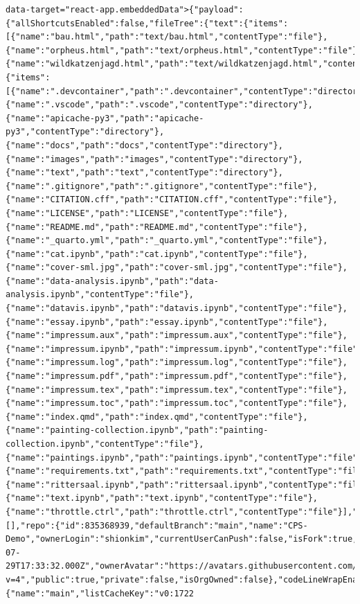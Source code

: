 \documentclass[
  letterpaper,
]{book}
\begin{document}
\begin{verbatim}
data-target="react-app.embeddedData">{"payload":{"allShortcutsEnabled":false,"fileTree":{"text":{"items":[{"name":"bau.html","path":"text/bau.html","contentType":"file"},{"name":"orpheus.html","path":"text/orpheus.html","contentType":"file"},{"name":"wildkatzenjagd.html","path":"text/wildkatzenjagd.html","contentType":"file"}],"totalCount":3},"":{"items":[{"name":".devcontainer","path":".devcontainer","contentType":"directory"},{"name":".vscode","path":".vscode","contentType":"directory"},{"name":"apicache-py3","path":"apicache-py3","contentType":"directory"},{"name":"docs","path":"docs","contentType":"directory"},{"name":"images","path":"images","contentType":"directory"},{"name":"text","path":"text","contentType":"directory"},{"name":".gitignore","path":".gitignore","contentType":"file"},{"name":"CITATION.cff","path":"CITATION.cff","contentType":"file"},{"name":"LICENSE","path":"LICENSE","contentType":"file"},{"name":"README.md","path":"README.md","contentType":"file"},{"name":"_quarto.yml","path":"_quarto.yml","contentType":"file"},{"name":"cat.ipynb","path":"cat.ipynb","contentType":"file"},{"name":"cover-sml.jpg","path":"cover-sml.jpg","contentType":"file"},{"name":"data-analysis.ipynb","path":"data-analysis.ipynb","contentType":"file"},{"name":"datavis.ipynb","path":"datavis.ipynb","contentType":"file"},{"name":"essay.ipynb","path":"essay.ipynb","contentType":"file"},{"name":"impressum.aux","path":"impressum.aux","contentType":"file"},{"name":"impressum.ipynb","path":"impressum.ipynb","contentType":"file"},{"name":"impressum.log","path":"impressum.log","contentType":"file"},{"name":"impressum.pdf","path":"impressum.pdf","contentType":"file"},{"name":"impressum.tex","path":"impressum.tex","contentType":"file"},{"name":"impressum.toc","path":"impressum.toc","contentType":"file"},{"name":"index.qmd","path":"index.qmd","contentType":"file"},{"name":"painting-collection.ipynb","path":"painting-collection.ipynb","contentType":"file"},{"name":"paintings.ipynb","path":"paintings.ipynb","contentType":"file"},{"name":"requirements.txt","path":"requirements.txt","contentType":"file"},{"name":"rittersaal.ipynb","path":"rittersaal.ipynb","contentType":"file"},{"name":"text.ipynb","path":"text.ipynb","contentType":"file"},{"name":"throttle.ctrl","path":"throttle.ctrl","contentType":"file"}],"totalCount":29}},"fileTreeProcessingTime":6.772167,"foldersToFetch":[],"repo":{"id":835368939,"defaultBranch":"main","name":"CPS-Demo","ownerLogin":"shionkim","currentUserCanPush":false,"isFork":true,"isEmpty":false,"createdAt":"2024-07-29T17:33:32.000Z","ownerAvatar":"https://avatars.githubusercontent.com/u/73858350?v=4","public":true,"private":false,"isOrgOwned":false},"codeLineWrapEnabled":false,"symbolsExpanded":false,"treeExpanded":true,"refInfo":{"name":"main","listCacheKey":"v0:1722
\end{verbatim}
\end{document}
